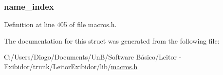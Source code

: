 \subsubsection[{name\+\_\+index}]{ name\+\_\+index}\label{structfield__info_ae939ac3ca00f5727beaa02d0e339183d}


Definition at line 405 of file macros.\+h.



The documentation for this struct was generated from the following file\+:\begin{DoxyCompactItemize}
\item 
C\+:/\+Users/\+Diogo/\+Documents/\+Un\+B/\+Software Básico/\+Leitor -\/ Exibidor/trunk/\+Leitor\+Exibidor/lib/\hyperlink{macros_8h}{macros.\+h}\end{DoxyCompactItemize}
